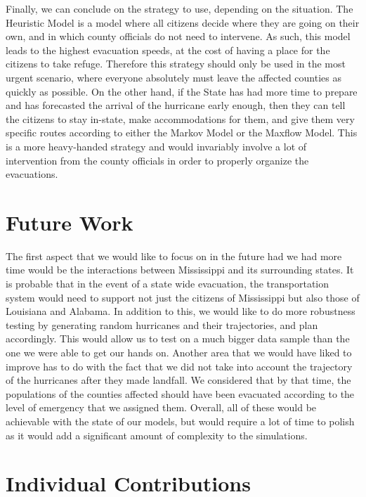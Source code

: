 \documentclass[titlepage]{article}
\begin{document}
\par Finally, we can conclude on the strategy to use, depending on the situation. The Heuristic Model is a model where all citizens decide where they are going on their own, and in which county officials do not need to intervene. As such, this model leads to the highest evacuation speeds, at the cost of having a place for the citizens to take refuge. Therefore this strategy should only be used in the most urgent scenario, where everyone absolutely must leave the affected counties as quickly as possible. On the other hand, if the State has had more time to prepare and has forecasted the arrival of the hurricane early enough, then they can tell the citizens to stay in-state, make accommodations for them, and give them very specific routes according to either the Markov Model or the Maxflow Model. This is a more heavy-handed strategy and would invariably involve a lot of intervention from the county officials in order to properly organize the evacuations.

\section{Future Work}
\label{sec:future}
The first aspect that we would like to focus on in the future had we had more time would be the interactions between Mississippi and its surrounding states. It is probable that in the event of a state wide evacuation, the transportation system would need to support not just the citizens of Mississippi but also those of Louisiana and Alabama.
\newline
In addition to this, we would like to do more robustness testing by generating random hurricanes and their trajectories, and plan accordingly. This would allow us to test on a much bigger data sample than the one we were able to get our hands on.
\newline
Another area that we would have liked to improve has to do with the fact that we did not take into account the trajectory of the hurricanes after they made landfall. We considered that by that time, the populations of the counties affected should have been evacuated according to the level of emergency that we assigned them.\newline
Overall, all of these would be achievable with the state of our models, but would require a lot of time to polish as it would add a significant amount of complexity to the simulations.

\section{Individual Contributions}
\label{sec:contributions}
\end{document}
